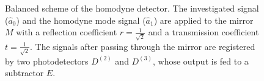 \begin{figure}
\centering



\caption{Balanced scheme of the homodyne detector. The investigated signal
  ($\hat{a}_0$) and the homodyne mode signal ($\hat{a}_1$) are applied to
  the mirror $M$ with a reflection coefficient $r=\frac{1}{\sqrt{2}}$ and
  a transmission coefficient $t=\frac{1}{\sqrt{2}}$. The signals after passing
  through the mirror are registered by two photodetectors $D^{(2)}$ and $D^{(3)}$,
  whose output is fed to a subtractor $E$.}
\label{figPart3Squeezed_13}
\end{figure}